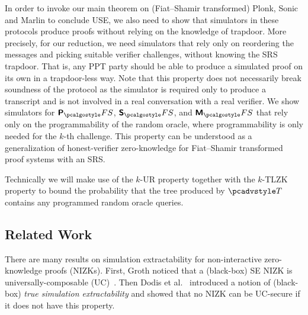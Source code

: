   In order to invoke our main theorem
on (Fiat--Shamir transformed) Plonk, Sonic and Marlin to conclude USE, we also need
to show that simulators in these protocols produce proofs without relying on the
knowledge of trapdoor. More precisely, for our reduction, we need simulators that rely
only on reordering the messages and picking suitable verifier challenges, without
knowing the SRS trapdoor.  That is, any PPT party should be able to produce a
simulated proof on its own in a trapdoor-less way. Note that this property does not
necessarily break soundness of the protocol as the simulator is required only to
produce a transcript and is not involved in a real conversation with a real
verifier. We show simulators for $\plonkprotfs$, $\sonicprotfs$, and $\marlinprotfs$
that rely only on the programmability of the random oracle, where programmability is only needed
for the $k$-th challenge. This property can be understood as a generalization of
honest-verifier zero-knowledge for Fiat--Shamir transformed proof systems with an
SRS.

Technically we will make use of the $k$-UR property together with the $k$-TLZK property to bound the probability that the tree produced by $\tdv$ contains any programmed random oracle queries.

\subsection{Related Work}
There are many results on simulation extractability for
non-interactive zero-knowledge proofs (NIZKs). First, Groth \cite{AC:Groth07}
noticed that a (black-box) SE NIZK is
universally-composable (UC)~\cite{EPRINT:Canetti00}. Then Dodis et al.~\cite{AC:DHLW10} introduced a
notion of (black-box) \emph{true simulation extractability} and showed that no
NIZK can be UC-secure if it does not have this property. 

